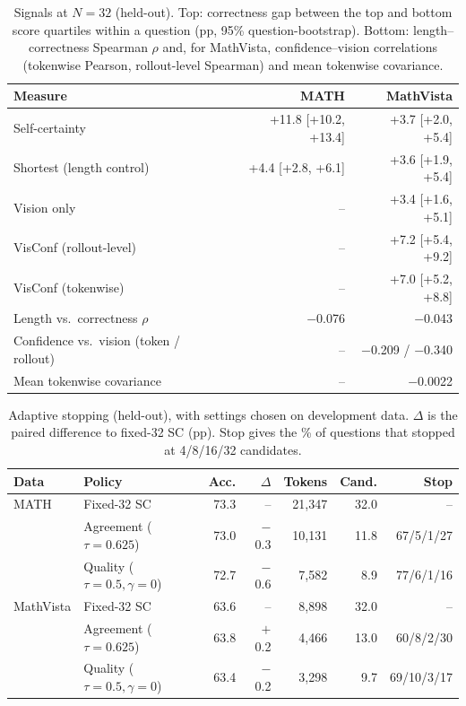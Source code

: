 \documentclass{article}
\begin{document}
\begin{table}[t]
  \centering
  \footnotesize
  \caption{Signals at $N{=}32$ (held-out). Top: correctness gap between the top and bottom score quartiles within a question (pp, 95\% question-bootstrap). Bottom: length--correctness Spearman $\rho$ and, for MathVista, confidence--vision correlations (tokenwise Pearson, rollout-level Spearman) and mean tokenwise covariance.}
  \label{tab:t3-signals}
  \begin{tabular}{lrr}
    \toprule
    Measure & MATH & MathVista \\
    \midrule
    Self-certainty & +11.8 [+10.2, +13.4] & +3.7 [+2.0, +5.4] \\
    Shortest (length control) & +4.4 [+2.8, +6.1] & +3.6 [+1.9, +5.4] \\
    Vision only & -- & +3.4 [+1.6, +5.1] \\
    VisConf (rollout-level) & -- & +7.2 [+5.4, +9.2] \\
    VisConf (tokenwise) & -- & +7.0 [+5.2, +8.8] \\
    \midrule
    Length vs.\ correctness $\rho$ & $-$0.076 & $-$0.043 \\
    Confidence vs.\ vision (token / rollout) & -- & $-$0.209 / $-$0.340 \\
    Mean tokenwise covariance & -- & $-$0.0022 \\
    \bottomrule
  \end{tabular}
\end{table}

\begin{table}[H]
  \centering
  \footnotesize
  \caption{Adaptive stopping (held-out), with settings chosen on development data. $\Delta$ is the paired difference to fixed-32 SC (pp). Stop gives the \% of questions that stopped at 4/8/16/32 candidates.}
  \label{tab:t3-adaptive}
  \begin{tabular}{llrrrrr}
    \toprule
    Data & Policy & Acc. & $\Delta$ & Tokens & Cand. & Stop \\
    \midrule
    MATH & Fixed-32 SC & 73.3 & -- & 21{,}347 & 32.0 & -- \\
     & Agreement ($\tau{=}0.625$) & 73.0 & $-$0.3 & 10{,}131 & 11.8 & 67/5/1/27 \\
     & Quality ($\tau{=}0.5,\gamma{=}0$) & 72.7 & $-$0.6 & 7{,}582 & 8.9 & 77/6/1/16 \\
    MathVista & Fixed-32 SC & 63.6 & -- & 8{,}898 & 32.0 & -- \\
     & Agreement ($\tau{=}0.625$) & 63.8 & $+$0.2 & 4{,}466 & 13.0 & 60/8/2/30 \\
     & Quality ($\tau{=}0.5,\gamma{=}0$) & 63.4 & $-$0.2 & 3{,}298 & 9.7 & 69/10/3/17 \\
    \bottomrule
  \end{tabular}
\end{table}
\end{document}
